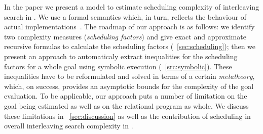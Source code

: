 In the paper we present a model to estimate scheduling complexity of interleaving search in \mK. We use a formal semantics which, in turn, reflects the
behaviour of actual implementations~\cite{CertifiedSemantics}. The roadmap of our approach is as follows: we identify two complexity measures (\emph{scheduling factors}) and
give exact and approximate recursive formulas to calculate the scheduling factors (\sectionword~\ref{sec:scheduling}); then we present an approach to
automaticaly extract inequalities for the scheduling factors for a whole goal using symbolic execution (\sectionword~\ref{src:symbolic}). These inequalities have
to be reformulated and solved in terms of a certain \emph{metatheory}, which, on success, provides an asymptotic bounds for the complexity of
the goal evaluation. To be applicable, our approach puts a number of limitation on the goal being estimated as well as on the relational program as whole. We discuss
these limitations in \sectionword~\ref{sec:discussion} as well as the contribution of scheduling in overall interleaving search complexity in \mK.

